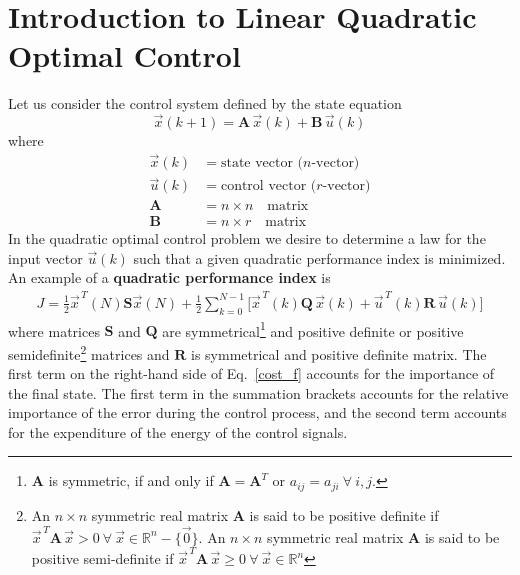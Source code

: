 \documentclass[11pt,a4paper,oneside]{book}
\numberwithin{equation}{section}
\theoremstyle{it}
\theoremstyle{definition}
\begin{document}
\section{Introduction to Linear Quadratic Optimal Control}
Let us consider the control system defined by the state equation
\begin{equation}\label{system}
	\vec{x}(k+1) = \mathbf{A}\,\vec{x}(k)+\mathbf{B}\,\vec{u}(k) 
\end{equation}
where
\begin{equation*}
	\begin{aligned}
		\vec{x}(k) &= \text{state vector ($n$-vector)} \\[6pt]
		\vec{u}(k) &= \text{control vector ($r$-vector)} \\[6pt]
		\mathbf{A} &= n \times n\quad\text{matrix} \\[6pt]
		\mathbf{B} &= n \times r\quad\text{matrix}
	\end{aligned}
\end{equation*}
In the quadratic optimal control problem we desire to determine a law for the input vector $\vec{u}(k)$ such that a given quadratic performance index is minimized. An example of a \textbf{quadratic performance index} is 
\begin{equation}\label{cost_f}
	\begin{aligned}
		J = 
		\frac{1}{2}\vec{x}^{\,T}(N)\mathbf{S}\vec{x}(N)+\frac{1}{2}\sum_{k=0}^{N-1}
		\Big[\vec{x}^{\,T}(k)\mathbf{Q}\,\vec{x}(k) + 
		\vec{u}^{\,T}(k)\mathbf{R}\,\vec{u}(k)\Big]
	\end{aligned}
\end{equation}
where matrices $\mathbf{S}$ and $\mathbf{Q}$ are symmetrical\footnote{$\mathbf{A}$ is symmetric, if and only if $\mathbf{A}=\mathbf{A}^T$ or $a_{ij}=a_{ji}\ \forall\ i,j$.} and positive 
definite or positive semidefinite\footnote{An $n\times n$ symmetric real matrix $\mathbf{A}$ is said to be positive definite if $\vec{x}^{\,T}\mathbf{A}\,\vec{x}>0\ \forall\ \vec{x}\in\mathbb{R}^n-\big\{\vec{0}\big\}$. An $n\times n$ symmetric real matrix $\mathbf{A}$ is said to be positive semi-definite if $\vec{x}^{\,T}\mathbf{A}\,\vec{x}\ge0\ \forall\ \vec{x}\in\mathbb{R}^n$} matrices and $\mathbf{R}$ is symmetrical and 
positive definite matrix. The first term on the right-hand side of 
Eq.~\eqref{cost_f} accounts for the importance of the final state. The first 
term in the summation brackets accounts for the relative importance of the 
error during the 
control process, and the second term accounts for the expenditure of the energy 
of the control signals.
\end{document}

